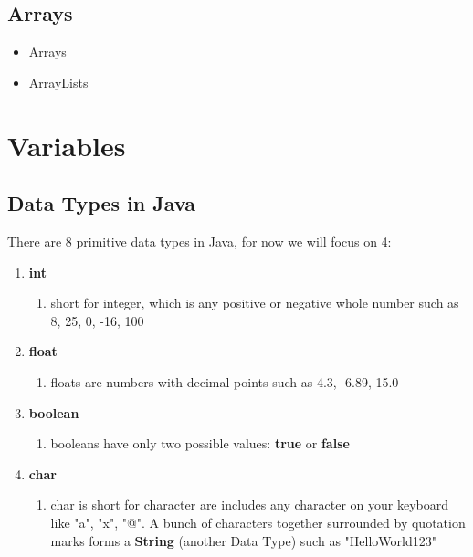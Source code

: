 \documentclass[14pt]{extreport}%
\begin{document}
\subsection*{Arrays }
\begin{itemize}
    \item Arrays
    \item ArrayLists
\end{itemize}


    
\section*{Variables}     
\subsection*{Data Types in Java}
There are 8 primitive data types in Java, for now we will focus on 4:
\begin{enumerate}
    \item \textbf{int}
    \begin{enumerate}
        \item short for integer, which is any positive or negative whole number such as 8, 25, 0, -16, 100
    \end{enumerate}
    \item \textbf{float} 
    \begin{enumerate}
        \item floats are numbers with decimal points such as 4.3, -6.89, 15.0
    \end{enumerate}
    \item \textbf{boolean} 
    \begin{enumerate}
        \item booleans have only two possible values: \textbf{true} or \textbf{false}
    \end{enumerate}
    
    \item \textbf{char}
    \begin{enumerate}
        \item char is short for character are includes any character on your keyboard like "a", "x", "@". A bunch of characters together surrounded by quotation marks forms a \textbf{String} (another Data Type) such as "HelloWorld123"
    \end{enumerate}
\end{enumerate}
\end{document}
